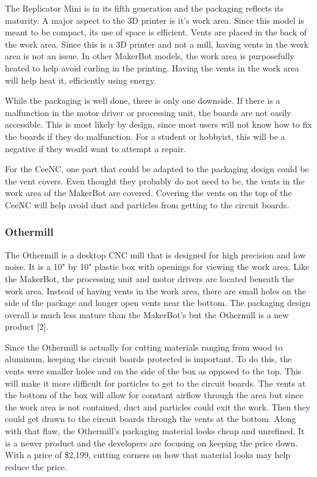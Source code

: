 The Replicator Mini is in its fifth generation and the packaging reflects its maturity.
A major aspect to the 3D printer is it's work area.
Since this model is meant to be compact, its use of space is efficient.
Vents are placed in the back of the work area.
Since this is a 3D printer and not a mill, having vents in the work area is not an issue.
In other MakerBot models, the work area is purposefully heated to help avoid curling in the printing.
Having the vents in the work area will help heat it, efficiently using energy.

While the packaging is well done, there is only one downside.
If there is a malfunction in the motor driver or processing unit, the boards are not easily accessible.
This is most likely by design, since most users will not know how to fix the boards if they do malfunction. 
For a student or hobbyist, this will be a negative if they would want to attempt a repair.

For the CeeNC, one part that could be adapted to the packaging design could be the vent covers.
Even thought they probably do not need to be, the vents in the work area of the MakerBot are covered.
Covering the vents on the top of the CeeNC will help avoid dust and particles from getting to the circuit boards.

\subsubsection{Othermill}

The Othermill is a desktop CNC mill that is designed for high precision and low noise. It is a 10" by 10" plastic box with openings for viewing the work area.
Like the MakerBot, the processing unit and motor drivers are located beneath the work area.
Instead of having vents in the work area, there are small holes on the side of the package and longer open vents near the bottom.
The packaging design overall is much less mature than the MakerBot's but the Othermill is a new product [2].

Since the Othermill is actually for cutting materials ranging from wood to aluminum, keeping the circuit boards protected is important.
To do this, the vents were smaller holes and on the side of the box as opposed to the top.
This will make it more difficult for particles to get to the circuit boards.
The vents at the bottom of the box will allow for constant airflow through the area but since the work area is not contained, duct and particles could exit the work.
Then they could get drawn to the circuit boards through the vents at the bottom.
Along with that flaw, the Othermill's packaging material looks cheap and unrefined.
It is a newer product and the developers are focusing on keeping the price down.
With a price of \$2,199, cutting corners on how that material looks may help reduce the price.

